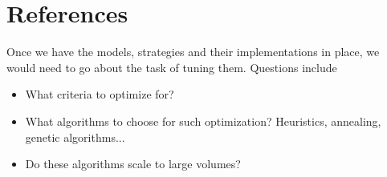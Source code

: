 \section{References}

Once we have the models, strategies and their implementations in place, we would need to go about the task of tuning them.
Questions include
\begin{itemize}
\item What criteria to optimize for?
\item What algorithms to choose for such optimization? Heuristics, annealing, genetic algorithms...
\item Do these algorithms scale to large volumes?
\end{itemize}

